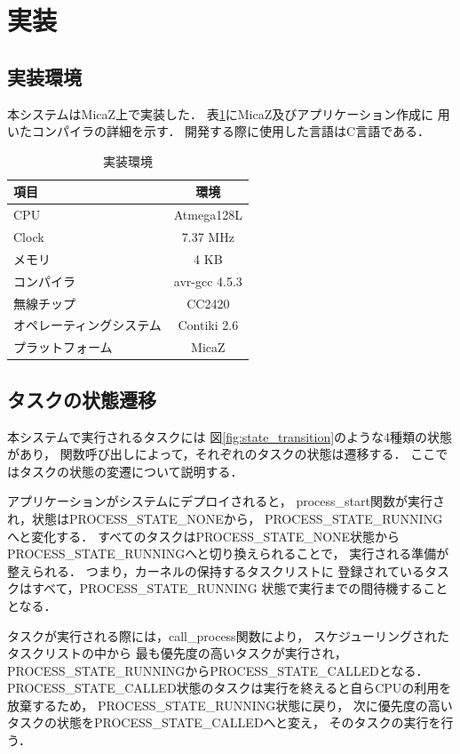 \section{実装}
\subsection{実装環境}
本システムはMicaZ上で実装した．
表\ref{tab:implementation_env}にMicaZ及びアプリケーション作成に
用いたコンパイラの詳細を示す．
開発する際に使用した言語はC言語である．


\begin{table}[htb]
  \centering
  \caption{実装環境}
  \begin{tabular}{|l||c|} \hline
  	項目	 & 環境 \\ \hline \hline
	CPU & Atmega128L \\ \hline
	Clock	& 7.37 MHz \\ \hline
	メモリ & 4 KB \\ \hline
	コンパイラ	& avr-gcc 4.5.3 \\ \hline
	無線チップ	& CC2420 \\ \hline
	オペレーティングシステム & Contiki 2.6 \\ \hline
	プラットフォーム & MicaZ \\ \hline
  \end{tabular}
  \label{tab:implementation_env}
\end{table}



\subsection{タスクの状態遷移}
本システムで実行されるタスクには
図\ref{fig:state_transition}のような4種類の状態があり，
関数呼び出しによって，それぞれのタスクの状態は遷移する．
ここではタスクの状態の変遷について説明する．

アプリケーションがシステムにデプロイされると，
process\_start関数が実行され，状態はPROCESS\_STATE\_NONEから，
PROCESS\_STATE\_RUNNINGへと変化する．
すべてのタスクはPROCESS\_STATE\_NONE状態から
PROCESS\_STATE\_RUNNINGへと切り換えられることで，
実行される準備が整えられる．
つまり，カーネルの保持するタスクリストに
登録されているタスクはすべて，PROCESS\_STATE\_RUNNING
状態で実行までの間待機することとなる．

タスクが実行される際には，call\_process関数により，
スケジューリングされたタスクリストの中から
最も優先度の高いタスクが実行され，
PROCESS\_STATE\_RUNNINGからPROCESS\_STATE\_CALLEDとなる．
PROCESS\_STATE\_CALLED状態のタスクは実行を終えると自らCPUの利用を放棄するため，
PROCESS\_STATE\_RUNNING状態に戻り，
次に優先度の高いタスクの状態をPROCESS\_STATE\_CALLEDへと変え，
そのタスクの実行を行う．

